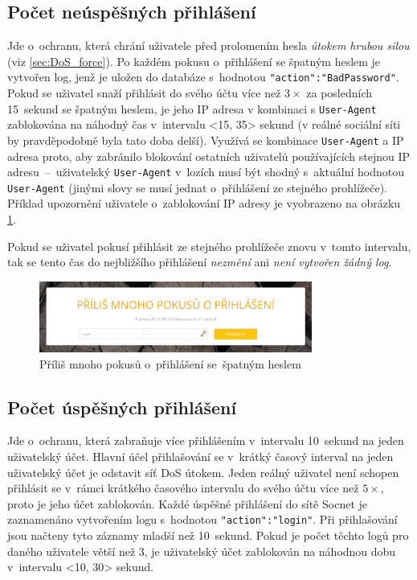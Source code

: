 \subsection*{Počet neúspěšných přihlášení}
\label{sec:num_of_unsucc_logins}
Jde o~ochranu, která chrání uživatele před prolomením hesla \textit{útokem hrubou silou} (viz \ref{sec:DoS_force}). Po každém pokusu o~přihlášení se špatným heslem je vytvořen log, jenž je uložen do databáze s~hodnotou \texttt{"action":"BadPassword"}. Pokud se uživatel snaží přihlásit do svého účtu více než $3\times$ za posledních 15~sekund se špatným heslem, je jeho IP adresa v kombinaci s \texttt{User-Agent} zablokována na náhodný čas v~intervalu <15, 35> sekund (v reálné sociální síti by pravděpodobně byla tato doba delší). Využívá se kombinace \texttt{User-Agent} a IP adresa proto, aby zabránilo blokování ostatních uživatelů používajících stejnou IP adresu~--~uživatelský \texttt{User-Agent} v~lozích musí být shodný s~aktuální hodnotou \texttt{User-Agent} (jinými slovy se musí jednat o~přihlášení ze stejného prohlížeče). Příklad upozornění uživatele o~zablokování IP adresy je vyobrazeno na obrázku \ref{img:blocked_IP}.

Pokud se uživatel pokusí přihlásit ze stejného prohlížeče znovu v~tomto intervalu, tak se tento čas do nejbližšího přihlášení \textit{nezmění} ani \textit{není vytvořen žádný log}. 

\begin{figure}[H]
	\centering
	\includegraphics[width=0.8\textwidth]{images/blocked_IP.jpg}
	\caption{Příliš mnoho pokusů o~přihlášení se~špatným heslem}
	\label{img:blocked_IP}
\end{figure}


\subsection*{Počet úspěšných přihlášení}
\label{sec:num_of_succ_logins}
Jde o~ochranu, která zabraňuje více přihlášením v~intervalu 10~sekund na jeden uživatelský účet. Hlavní účel přihlašování se v~krátký časový interval na jeden uživatelský účet je odstavit síť DoS útokem. Jeden reálný uživatel není schopen přihlásit se v~rámci krátkého časového intervalu do svého účtu více než $5\times$, proto je jeho účet zablokován. Každé úspěšné přihlášení do sítě Socnet je zaznamenáno vytvořením logu s~hodnotou \texttt{"action":"login"}. Při přihlašování jsou načteny tyto záznamy mladší než 10~sekund. Pokud je počet těchto logů pro daného uživatele větší než 3, je uživatelský účet zablokován na náhodnou dobu v~intervalu <10, 30> sekund.

